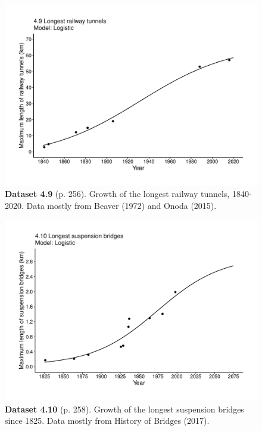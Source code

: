 \documentclass[aps,rmp,preprint,superscriptaddress,10pt,onecolumn]{article}
\begin{document}
\clearpage
\begin{figure}[h]
\includegraphics[width=\textwidth]{output/figs-ggplot/4.9.pdf}
\caption*{\textbf{Dataset 4.9} (p. 256). Growth of the longest railway tunnels, 1840-2020. Data mostly from Beaver (1972) and Onoda (2015).}
\end{figure}
	
\clearpage
\begin{figure}[h]
\includegraphics[width=\textwidth]{output/figs-ggplot/4.10.pdf}
\caption*{\textbf{Dataset 4.10} (p. 258). Growth of the longest suspension bridges since 1825. Data mostly from History of Bridges (2017).}
\end{figure}
	
\end{document}
